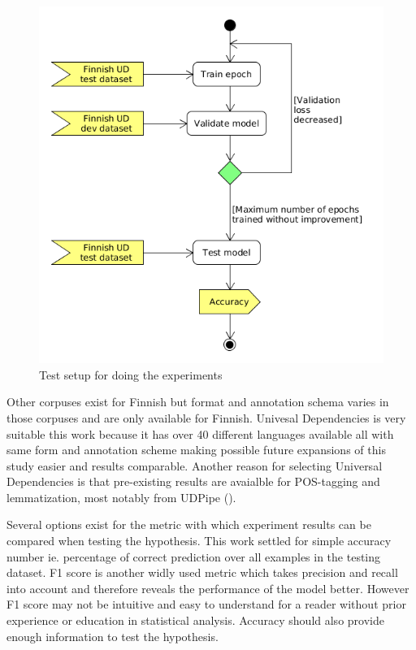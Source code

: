 \documentclass[12pt,a4paper,english
]{tutthesis}
\begin{document}
\begin{figure}[htbp]
\caption{Test setup for doing the experiments}
\label{figure:test_setup}
\centering
\includegraphics[width=15cm]{test_setup.png}
\end{figure}

Other corpuses exist for Finnish but format and annotation schema varies in those corpuses and are only available for Finnish. Univesal Dependencies is very suitable this work because it has over 40 different languages available all with same form and annotation scheme making possible future expansions of this study easier and results comparable. Another reason for selecting Universal Dependencies is that pre-existing results are avaialble for POS-tagging and lemmatization, most notably from UDPipe (\cite{Straka2017}).

Several options exist for the metric with which experiment results can be compared when testing the hypothesis. This work settled for simple accuracy number ie. percentage of correct prediction over all examples in the testing dataset. F1 score is another widly used metric which takes precision and recall into account and therefore reveals the performance of the model better. However F1 score may not be intuitive and easy to understand for a reader without prior experience or education in statistical analysis. Accuracy should also provide enough information to test the hypothesis.
\end{document}

